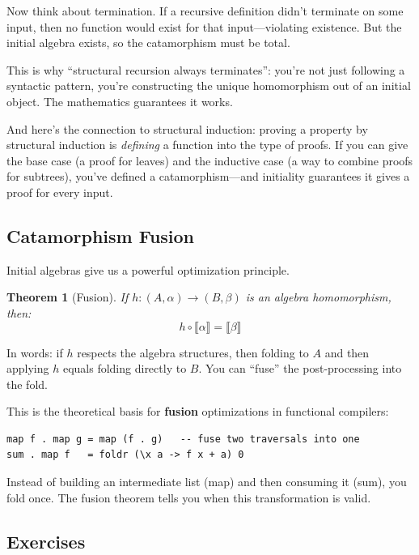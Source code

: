 \documentclass[11pt]{article}
\theoremstyle{definition}
\theoremstyle{plain}
\newtheorem{theorem}{Theorem}[section]
\theoremstyle{remark}
\begin{document}
Now think about termination. If a recursive definition didn't terminate on some input, then no function would exist for that input---violating existence. But the initial algebra exists, so the catamorphism must be total.

This is why ``structural recursion always terminates'': you're not just following a syntactic pattern, you're constructing the unique homomorphism out of an initial object. The mathematics guarantees it works.

And here's the connection to structural induction: proving a property by structural induction is \emph{defining} a function into the type of proofs. If you can give the base case (a proof for leaves) and the inductive case (a way to combine proofs for subtrees), you've defined a catamorphism---and initiality guarantees it gives a proof for every input.

\subsection{Catamorphism Fusion}

Initial algebras give us a powerful optimization principle.

\begin{theorem}[Fusion]
If $h: (A, \alpha) \to (B, \beta)$ is an algebra homomorphism, then:
\[
h \circ \llbracket \alpha \rrbracket = \llbracket \beta \rrbracket
\]
\end{theorem}

In words: if $h$ respects the algebra structures, then folding to $A$ and then applying $h$ equals folding directly to $B$. You can ``fuse'' the post-processing into the fold.

\begin{programmingnote}
This is the theoretical basis for \textbf{fusion} optimizations in functional compilers:
\begin{verbatim}
map f . map g = map (f . g)   -- fuse two traversals into one
sum . map f   = foldr (\x a -> f x + a) 0
\end{verbatim}
Instead of building an intermediate list (map) and then consuming it (sum), you fold once. The fusion theorem tells you when this transformation is valid.
\end{programmingnote}

\subsection{Exercises}
\end{document}
